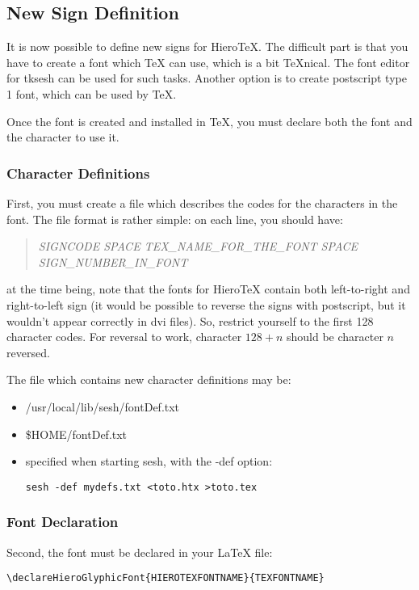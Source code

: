 \documentclass[final]{article}
\newcommand{\HieroTeX}{Hiero\TeX{}}
\begin{document}
\subsection{New Sign Definition}

It is now possible to define new signs for \HieroTeX{}. The difficult
part is that you have to create a font which \TeX{} can use, which is
a bit \TeX{}nical. The font editor for tksesh can be used for such
tasks. Another option is to create postscript type 1 font, which can be used by \TeX{}.

Once the font is created and installed in TeX, you must declare both
the font and the character to use it.

\subsubsection{Character Definitions}


First, you must create a file which describes the codes for the
characters in the font. The file format is rather simple:
on each line, you should have:
\begin{quotation}
  \textsl{SIGNCODE SPACE TEX\_NAME\_FOR\_THE\_FONT SPACE SIGN\_NUMBER\_IN\_FONT} 
\end{quotation}
at the time being, note that the fonts for \HieroTeX{} contain both
left-to-right and right-to-left sign (it would be possible to reverse
the signs with postscript, but it wouldn't appear correctly in dvi
files). So, restrict yourself to the first 128 character codes. For
reversal to work, character $128 + n$ should be character $n$
reversed.

The file which contains new character definitions may be:
\begin{itemize}
\item /usr/local/lib/sesh/fontDef.txt
\item \$HOME/fontDef.txt
\item specified when starting sesh, with the -def option:
\begin{verbatim}
sesh -def mydefs.txt <toto.htx >toto.tex
\end{verbatim}
\end{itemize}
\subsubsection{Font Declaration}

Second, the font must be declared in your \LaTeX{} file:
\begin{verbatim}
\declareHieroGlyphicFont{HIEROTEXFONTNAME}{TEXFONTNAME}
\end{verbatim}
\end{document}
